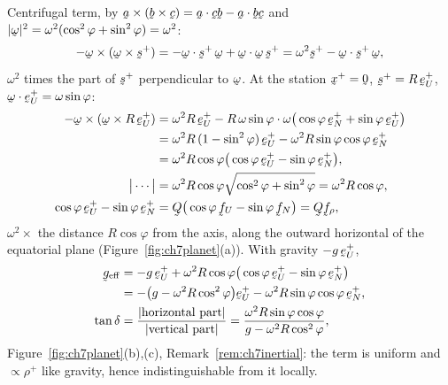 \begin{solution}
Centrifugal term, by $\ba\times(\bb\times\bc)=\ip{\ba}{\bc}\bb
-\ip{\ba}{\bb}\bc$ and
$|\bom|^{2}=\omega^{2}(\cos^{2}\varphi+\sin^{2}\varphi)=\omega^{2}$:
\begin{equation*}
   -\bom\times(\bom\times\bs^{+})
   =-\ip{\bom}{\bs^{+}}\,\bom+\ip{\bom}{\bom}\,\bs^{+}
   =\omega^{2}\bs^{+}-\ip{\bom}{\bs^{+}}\,\bom ,
\end{equation*}
$\omega^{2}$ times the part of $\bs^{+}$ perpendicular to $\bom$. At the
station $\bx^{+}=\bze$, $\bs^{+}=R\,\be^{+}_{U}$,
$\ip{\bom}{\be^{+}_{U}}=\omega\sin\varphi$:
\begin{align*}
   -\bom\times(\bom\times R\,\be^{+}_{U})
   &=\omega^{2}R\,\be^{+}_{U}
     -R\,\omega\sin\varphi\cdot\omega\big(\cos\varphi\,\be^{+}_{N}
     +\sin\varphi\,\be^{+}_{U}\big)\\
   &=\omega^{2}R\,(1-\sin^{2}\varphi)\,\be^{+}_{U}
     -\omega^{2}R\sin\varphi\cos\varphi\,\be^{+}_{N}\\
   &=\omega^{2}R\cos\varphi
     \big(\cos\varphi\,\be^{+}_{U}-\sin\varphi\,\be^{+}_{N}\big),\\
   \big|\cdots\big|&=\omega^{2}R\cos\varphi
     \sqrt{\cos^{2}\varphi+\sin^{2}\varphi}=\omega^{2}R\cos\varphi,\\
   \cos\varphi\,\be^{+}_{U}-\sin\varphi\,\be^{+}_{N}
   &=\bQ\big(\cos\varphi\,\bff_{U}-\sin\varphi\,\bff_{N}\big)
    =\bQ\bff_{\rho},
\end{align*}
$\omega^{2}\times$ the distance $R\cos\varphi$ from the axis, along the
outward horizontal of the equatorial plane
(Figure~\ref{fig:ch7planet}(a)). With gravity $-g\,\be^{+}_{U}$,
\begin{align*}
   \bg_{\mathrm{eff}}
   &=-g\,\be^{+}_{U}+\omega^{2}R\cos\varphi
     \big(\cos\varphi\,\be^{+}_{U}-\sin\varphi\,\be^{+}_{N}\big)\\
   &=-\big(g-\omega^{2}R\cos^{2}\varphi\big)\be^{+}_{U}
     -\omega^{2}R\sin\varphi\cos\varphi\,\be^{+}_{N},\\
   \tan\delta&=\frac{|\text{horizontal part}|}{|\text{vertical part}|}
   =\frac{\omega^{2}R\sin\varphi\cos\varphi}
         {g-\omega^{2}R\cos^{2}\varphi},
\end{align*}
Figure~\ref{fig:ch7planet}(b),(c), Remark~\ref{rem:ch7inertial}: the
term is uniform and $\propto\rho^{+}$ like gravity, hence
indistinguishable from it locally.


\end{solution}
